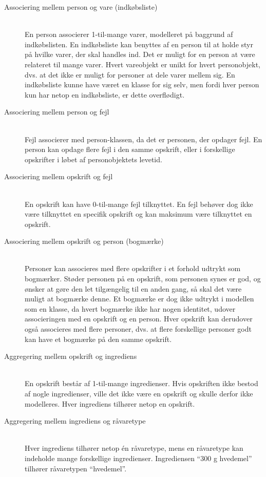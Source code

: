 \begin{description}

\item[Associering mellem person og vare (indkøbsliste)] \hfill \\
En person associerer 1-til-mange varer, modelleret på baggrund af indkøbslisten. En indkøbsliste kan benyttes af en person til at holde styr på hvilke varer, der skal handles ind.  Det er muligt for en person at være relateret til mange varer. Hvert vareobjekt er unikt for hvert personobjekt, dvs. at det ikke er muligt for personer at dele varer mellem sig. En indkøbsliste kunne have været en klasse for sig selv, men fordi hver person kun har netop en indkøbsliste, er dette overflødigt.

\item[Associering mellem person og fejl] \hfill \\
Fejl associerer med person-klassen, da det er personen, der opdager fejl. En person kan opdage flere fejl i den samme opskrift, eller i forskellige opskrifter i løbet af personobjektets levetid.

\item[Associering mellem opskrift og fejl] \hfill \\
En opskrift kan have 0-til-mange fejl tilknyttet. En fejl behøver dog ikke være tilknyttet en specifik opskrift og kan maksimum være tilknyttet en opskrift.

\item[Associering mellem opskrift og person (bogmærke)] \hfill \\
Personer kan associeres med flere opskrifter i et forhold udtrykt som bogmærker. Støder personen på en opskrift, som personen synes er god, og ønsker at gøre den let tilgængelig til en anden gang, så skal det være muligt at bogmærke denne. Et bogmærke er dog ikke udtrykt i modellen som en klasse, da hvert bogmærke ikke har nogen identitet, udover associeringen med en opskrift og en person. Hver opskrift kan derudover også associeres med flere personer, dvs. at flere forskellige personer godt kan have et bogmærke på den samme opskrift. 

\item[Aggregering mellem opskrift og ingrediens] \hfill \\
En opskrift består af 1-til-mange ingredienser. Hvis opskriften ikke bestod af nogle ingredienser, ville det ikke være en opskrift og skulle derfor ikke modelleres. Hver ingrediens tilhører netop en opskrift.

\item[Aggregering mellem ingrediens og råvaretype] \hfill \\
Hver ingrediens tilhører netop én råvaretype, mens en råvaretype kan indeholde mange forskellige ingredienser. Ingrediensen ``300 g hvedemel'' tilhører \fx råvaretypen ``hvedemel''.

\end{description}

